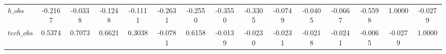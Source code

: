 \begin{center}
\begin{longtable}{lcccccccccccccc}
$h\_obs         $	 & 	          -0.2167	 & 	          -0.0338	 & 	          -0.1248	 & 	          -0.1111	 & 	          -0.2631	 & 	          -0.2550	 & 	          -0.3550	 & 	          -0.3305	 & 	          -0.0749	 & 	          -0.0405	 & 	          -0.0667	 & 	          -0.5598	 & 	           1.0000	 & 	          -0.0279 \\ 
$tech\_obs      $	 & 	           0.5374	 & 	           0.7073	 & 	           0.6621	 & 	           0.3038	 & 	          -0.0781	 & 	           0.6158	 & 	          -0.0139	 & 	          -0.0230	 & 	          -0.0231	 & 	          -0.0218	 & 	          -0.0241	 & 	          -0.0065	 & 	          -0.0279	 & 	           1.0000 \\ 
\end{longtable}
 \end{center}
